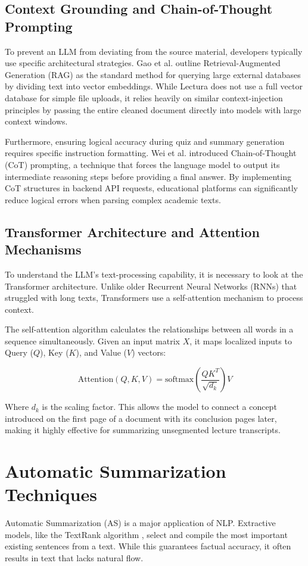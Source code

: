 \subsection{Context Grounding and Chain-of-Thought Prompting}
To prevent an LLM from deviating from the source material, developers typically use specific architectural strategies. Gao et al. \cite{gao2023retrieval} outline Retrieval-Augmented Generation (RAG) as the standard method for querying large external databases by dividing text into vector embeddings. While Lectura does not use a full vector database for simple file uploads, it relies heavily on similar context-injection principles by passing the entire cleaned document directly into models with large context windows.

Furthermore, ensuring logical accuracy during quiz and summary generation requires specific instruction formatting. Wei et al. \cite{wei2022chain} introduced Chain-of-Thought (CoT) prompting, a technique that forces the language model to output its intermediate reasoning steps before providing a final answer. By implementing CoT structures in backend API requests, educational platforms can significantly reduce logical errors when parsing complex academic texts.

\subsection{Transformer Architecture and Attention Mechanisms}
To understand the LLM's text-processing capability, it is necessary to look at the Transformer architecture. Unlike older Recurrent Neural Networks (RNNs) that struggled with long texts, Transformers use a self-attention mechanism to process context. 

The self-attention algorithm calculates the relationships between all words in a sequence simultaneously. Given an input matrix $X$, it maps localized inputs to Query ($Q$), Key ($K$), and Value ($V$) vectors:

\begin{equation}
    \text{Attention}(Q, K, V) = \text{softmax}\left(\frac{QK^T}{\sqrt{d_k}}\right)V
\end{equation}

Where $d_k$ is the scaling factor. This allows the model to connect a concept introduced on the first page of a document with its conclusion pages later, making it highly effective for summarizing unsegmented lecture transcripts.

\section{Automatic Summarization Techniques}
Automatic Summarization (AS) is a major application of NLP. Extractive models, like the TextRank algorithm \cite{mihalcea2004textrank}, select and compile the most important existing sentences from a text. While this guarantees factual accuracy, it often results in text that lacks natural flow.

